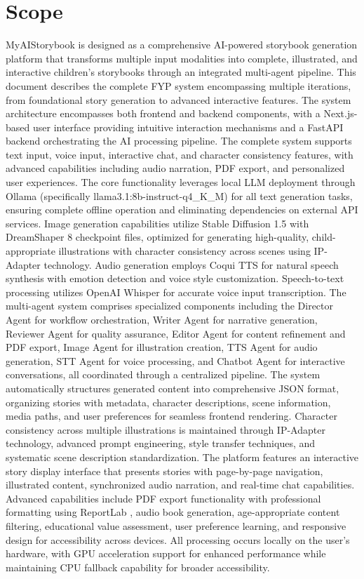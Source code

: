 \section{Scope}
MyAIStorybook is designed as a comprehensive AI-powered storybook generation platform that transforms multiple input modalities into complete, illustrated, and interactive children's storybooks through an integrated multi-agent pipeline. This document describes the complete FYP system encompassing multiple iterations, from foundational story generation to advanced interactive features. The system architecture encompasses both frontend and backend components, with a Next.js-based \cite{nextjs2024} user interface providing intuitive interaction mechanisms and a FastAPI \cite{fastapi2024} backend orchestrating the AI processing pipeline. The complete system supports text input, voice input, interactive chat, and character consistency features, with advanced capabilities including audio narration, PDF export, and personalized user experiences. The core functionality leverages local LLM deployment through Ollama (specifically llama3.1:8b-instruct-q4\_K\_M) for all text generation tasks, ensuring complete offline operation and eliminating dependencies on external API services. Image generation capabilities utilize Stable Diffusion 1.5 with DreamShaper 8 checkpoint files, optimized for generating high-quality, child-appropriate illustrations with character consistency across scenes using IP-Adapter technology. Audio generation employs Coqui TTS \cite{coqui2024} for natural speech synthesis with emotion detection and voice style customization. Speech-to-text processing utilizes OpenAI Whisper \cite{whisper2023} for accurate voice input transcription. The multi-agent system comprises specialized components including the Director Agent for workflow orchestration, Writer Agent for narrative generation, Reviewer Agent for quality assurance, Editor Agent for content refinement and PDF export, Image Agent for illustration creation, TTS Agent for audio generation, STT Agent for voice processing, and Chatbot Agent for interactive conversations, all coordinated through a centralized pipeline. The system automatically structures generated content into comprehensive JSON format, organizing stories with metadata, character descriptions, scene information, media paths, and user preferences for seamless frontend rendering. Character consistency across multiple illustrations is maintained through IP-Adapter technology, advanced prompt engineering, style transfer techniques, and systematic scene description standardization. The platform features an interactive story display interface that presents stories with page-by-page navigation, illustrated content, synchronized audio narration, and real-time chat capabilities. Advanced capabilities include PDF export functionality with professional formatting using ReportLab \cite{reportlab2024}, audio book generation, age-appropriate content filtering, educational value assessment, user preference learning, and responsive design for accessibility across devices. All processing occurs locally on the user's hardware, with GPU acceleration support for enhanced performance while maintaining CPU fallback capability for broader accessibility. 